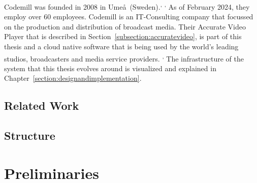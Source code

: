 \documentclass[12pt,a4paper]{article}
\begin{document}
Codemill was founded in 2008 in Ume\aa \ (Sweden).\textsuperscript{,} \textsuperscript{,} 
As of February 2024, they employ over 60 employees.  
Codemill is an IT-Consulting company that focussed on the production and distribution of broadcast media. Their Accurate Video Player that is described in Section~\ref{subsection:accuratevideo}, is part of this thesis and a cloud native software that is being used by the world's leading studios, broadcasters and media service providers. \textsuperscript{,}  
The infrastructure of the system that this thesis evolves around is visualized and explained in Chapter~\ref{section:designandimplementation}.












\subsection{Related Work} \label{subsection:relatedwork}










\subsection{Structure} \label{subsection:structure}









%
%
%
%
%
%
%
%
\newpage
\section{Preliminaries} \label{section:preliminaries}
\end{document}
